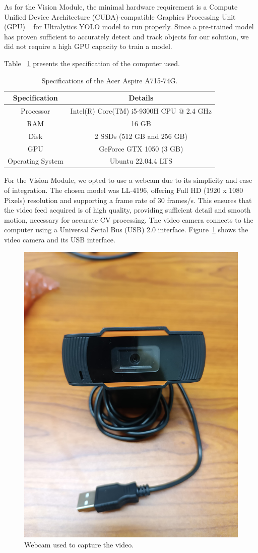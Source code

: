 As for the Vision Module, the minimal hardware requirement is a Compute Unified Device Architecture (CUDA)-compatible Graphics Processing Unit (GPU) ~\cite{ultralytics_faq} for Ultralytics YOLO model to run properly.
Since a pre-trained model has proven sufficient to accurately detect and track objects for our solution, we did not require a high GPU capacity to train a model.

Table ~\ref{tab:specs_pc} presents the specification of the computer used.

\begin{table}[H]
    \caption{Specifications of the Acer Aspire A715-74G.}
    \label{tab:specs_pc}
    \begin{tabular}{|c|c|}
        \hline
        \textbf{Specification} & \textbf{Details} \\ \hline
        Processor                      &           Intel(R) Core(TM) i5-9300H CPU @ 2.4 GHz   \\ \hline
        RAM                      &          16 GB        \\ \hline
        Disk                      &   2 SSDs  (512 GB and 256 GB)         \\ \hline
        GPU                     &   GeForce GTX 1050 (3 GB)      \\ \hline
        Operating System & Ubuntu 22.04.4 LTS                  \\ \hline
    \end{tabular}
\end{table}

For the Vision Module, we opted to use a webcam due to its simplicity and ease of integration.
The chosen model was LL-4196, offering Full HD (1920 x 1080 Pixels) resolution and supporting a frame rate of 30 frames/s\@.
This ensures that the video feed acquired is of high quality, providing sufficient detail and smooth motion, necessary for accurate CV processing.
The video camera connects to the computer using a Universal Serial Bus (USB) 2.0 interface.
Figure~\ref{fig:camera} shows the video camera and its USB interface.

\begin{figure}[H]
    \centering
    \includegraphics[width=0.3\linewidth]{figures/webcam}
    \caption{Webcam used to capture the video.}
    \label{fig:camera}
\end{figure}

